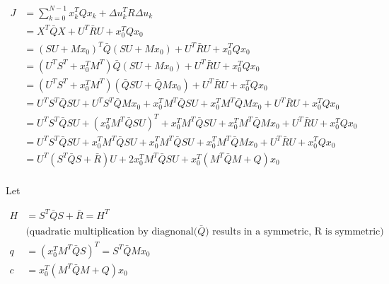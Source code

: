 \documentclass{article}
\begin{document}
\begin{equation}
  \begin{aligned}
    J &= \sum_{k=0}^{N-1} x_k^T Q x_k + \Delta u_k^T R \Delta u_k \\
    &= X^T \bar{Q} X + U^T \bar{R} U + x_0^T Q x_0 \\
    &= (S U + M x_0)^T \bar{Q} (S U + M x_0) + U^T \bar{R} U + x_0^T Q x_0 \\
    &= (U^T S^T + x_0^T M^T) \bar{Q} (S U + M x_0) + U^T \bar{R} U + x_0^T Q x_0 \\
    &= (U^T S^T + x_0^T M^T) (\bar{Q} S U + \bar{Q} M x_0) + U^T \bar{R} U + x_0^T Q x_0 \\
    &= U^T S^T \bar{Q} S U + U^T S^T \bar{Q} M x_0 + x_0^T M^T \bar{Q} S U + x_0^T M^T \bar{Q} M x_0 + U^T \bar{R} U + x_0^T Q x_0 \\
    &= U^T S^T \bar{Q} S U + (x_0^T M^T \bar{Q} S U)^T + x_0^T M^T \bar{Q} S U + x_0^T M^T \bar{Q} M x_0 + U^T \bar{R} U + x_0^T Q x_0 \\
    &= U^T S^T \bar{Q} S U + x_0^T M^T \bar{Q} S U + x_0^T M^T \bar{Q} S U + x_0^T M^T \bar{Q} M x_0 + U^T \bar{R} U + x_0^T Q x_0 \\
    &= U^T (S^T \bar{Q} S + \bar{R}) U + 2 x_0^T M^T \bar{Q} S U + x_0^T(M^T \bar{Q} M + Q) x_0\\
  \end{aligned}
\end{equation}

Let

$$
\begin{aligned}
  H &= S^T \bar{Q} S + \bar{R} = H^T \\
  &\text{(quadratic multiplication by diagnonal($\bar{Q}$) results in a symmetric, R is symmetric)} \\
  q &= (x_0^T M^T \bar{Q} S)^T = S^T \bar{Q} M x_0 \\
  c &= x_0^T (M^T \bar{Q} M + Q) x_0
\end{aligned}
$$
\end{document}
